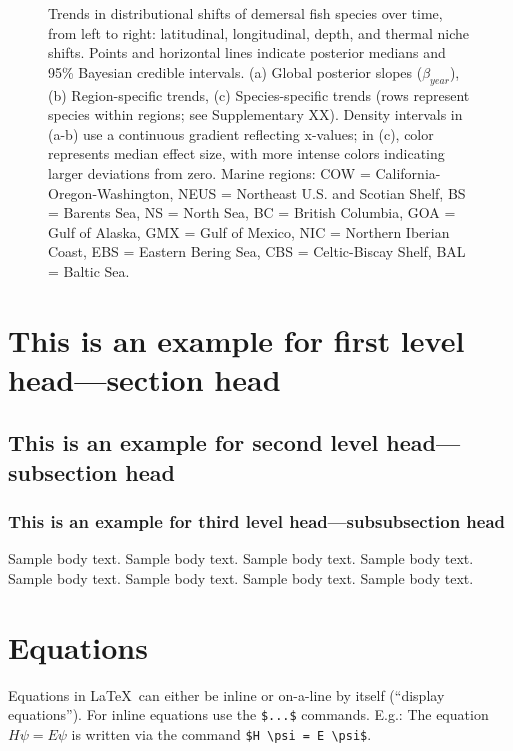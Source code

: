 \documentclass[lineno,pdflatex,sn-nature]{sn-jnl}%
\begin{document}
\begin{figure}[h]
\label{fig:posterior_slopes}
\caption{Trends in distributional shifts of demersal fish species over time, from left to right: latitudinal, longitudinal, depth, and thermal niche shifts. Points and horizontal lines indicate posterior medians and 95\% Bayesian credible intervals.  
(a) Global posterior slopes ($\beta_{year}$),  
(b) Region-specific trends,  
(c) Species-specific trends (rows represent species within regions; see Supplementary XX).  
Density intervals in (a-b) use a continuous gradient reflecting x-values; in (c), color represents median effect size, with more intense colors indicating larger deviations from zero.  
Marine regions: COW = California-Oregon-Washington, NEUS = Northeast U.S. and Scotian Shelf, BS = Barents Sea, NS = North Sea, BC = British Columbia, GOA = Gulf of Alaska, GMX = Gulf of Mexico, NIC = Northern Iberian Coast, EBS = Eastern Bering Sea, CBS = Celtic-Biscay Shelf, BAL = Baltic Sea.}
\end{figure}


\section{This is an example for first level head---section head}\label{sec3}

\subsection{This is an example for second level head---subsection head}\label{subsec2}

\subsubsection{This is an example for third level head---subsubsection head}\label{subsubsec2}

Sample body text. Sample body text. Sample body text. Sample body text. Sample body text. Sample body text. Sample body text. Sample body text. 

\section{Equations}\label{sec4}

Equations in \LaTeX\ can either be inline or on-a-line by itself (``display equations''). For
inline equations use the \verb+$...$+ commands. E.g.: The equation
$H\psi = E \psi$ is written via the command \verb+$H \psi = E \psi$+.
\end{document}
